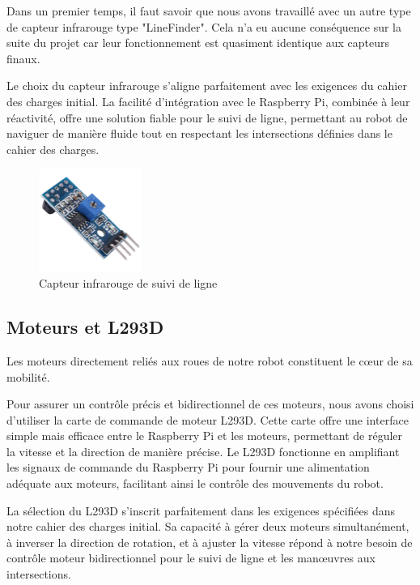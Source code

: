 Dans un premier temps, il faut savoir que nous avons travaillé avec un autre type de capteur infrarouge type "LineFinder". Cela n'a eu aucune conséquence sur la suite du projet car leur fonctionnement est quasiment identique aux capteurs finaux.

Le choix du capteur infrarouge s'aligne parfaitement avec les exigences du cahier des charges initial. La facilité d'intégration avec le Raspberry Pi, combinée à leur réactivité, offre une solution fiable pour le suivi de ligne, permettant au robot de naviguer de manière fluide tout en respectant les intersections définies dans le cahier des charges.

\begin{figure}[h]
    \centering
    \includegraphics[width=0.3\textwidth]{images/components/line_finder.jpg}
    \caption{Capteur infrarouge de suivi de ligne}
    \label{fig:TCRT5000}
\end{figure}

\subsection{Moteurs et L293D}
Les moteurs directement reliés aux roues de notre robot constituent le cœur de sa mobilité.

Pour assurer un contrôle précis et bidirectionnel de ces moteurs, nous avons choisi d'utiliser la carte de commande de moteur L293D. Cette carte offre une interface simple mais efficace entre le Raspberry Pi et les moteurs, permettant de réguler la vitesse et la direction de manière précise. Le L293D fonctionne en amplifiant les signaux de commande du Raspberry Pi pour fournir une alimentation adéquate aux moteurs, facilitant ainsi le contrôle des mouvements du robot.

La sélection du L293D s'inscrit parfaitement dans les exigences spécifiées dans notre cahier des charges initial. Sa capacité à gérer deux moteurs simultanément, à inverser la direction de rotation, et à ajuster la vitesse répond à notre besoin de contrôle moteur bidirectionnel pour le suivi de ligne et les manœuvres aux intersections.

